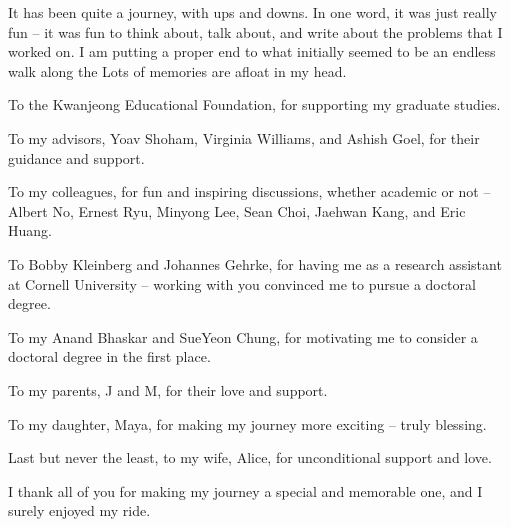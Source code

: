 It has been quite a journey, with ups and downs.
In one word, it was just really fun -- it was fun to think about, talk about, and write about the problems that I worked on. 
I am putting a proper end to what initially seemed to be an endless walk along the 
Lots of memories are afloat in my head.


To the Kwanjeong Educational Foundation, for supporting my graduate studies.

To my advisors, Yoav Shoham, Virginia Williams, and Ashish Goel, for their guidance and support.

To my colleagues, for fun and inspiring discussions, whether academic or not -- Albert No, Ernest Ryu, Minyong Lee, Sean Choi, Jaehwan Kang, and Eric Huang.

To Bobby Kleinberg and Johannes Gehrke, for having me as a research assistant at Cornell University -- working with you convinced me to pursue a doctoral degree.

To my Anand Bhaskar and SueYeon Chung, for motivating me to consider a doctoral degree in the first place.

To my parents, J and M, for their love and support.

To my daughter, Maya, for making my journey more exciting -- truly blessing.

Last but never the least, to my wife, Alice, for unconditional support and love.

I thank all of you for making my journey a special and memorable one, and I surely enjoyed my ride.


